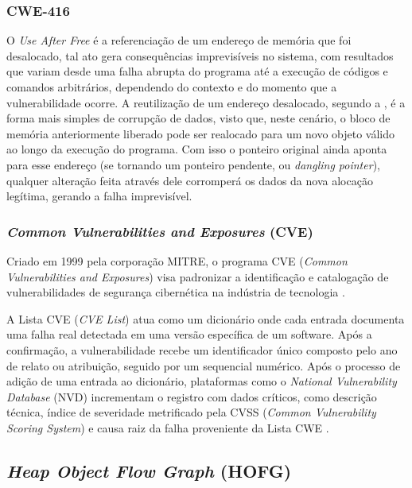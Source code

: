 \documentclass[
    12pt,                %
    openright,           %
    oneside,             %
    a4paper,             %
    english,             %
    brazil               %
]{abntex2}
\begin{document}
\subsubsection{CWE-416}
\label{subsec:cwe416}

O \textit{Use After Free} é a referenciação de um endereço de memória que foi desalocado, tal ato gera consequências imprevisíveis no sistema, com resultados que variam desde uma falha abrupta do programa até a execução de códigos e comandos arbitrários, 
dependendo do contexto e do momento que a vulnerabilidade ocorre. A reutilização de um endereço desalocado, segundo a , é a forma mais simples de corrupção de dados, visto que, neste cenário, 
o bloco de memória anteriormente liberado pode ser realocado para um novo objeto válido ao longo da execução do programa. Com isso o ponteiro original ainda aponta para esse endereço (se tornando um ponteiro pendente, ou \textit{dangling pointer}), 
qualquer alteração feita através dele corromperá os dados da nova alocação legítima, gerando a falha imprevisível.

\subsubsection{\textit{Common Vulnerabilities and Exposures} (CVE)}
\label{subsec:cve}

Criado em 1999 pela corporação MITRE, o programa CVE (\textit{Common Vulnerabilities and Exposures}) visa padronizar a identificação e catalogação de vulnerabilidades de segurança cibernética na indústria de tecnologia \cite{Cve2026}.

\par
A Lista CVE (\textit{CVE List}) atua como um dicionário onde cada entrada documenta uma falha real detectada em uma versão específica de um software. Após a confirmação, a vulnerabilidade recebe um identificador único composto pelo ano de relato ou atribuição, seguido por um sequencial numérico. 
Após o processo de adição de uma entrada ao dicionário, plataformas como o \textit{National Vulnerability Database} (NVD) incrementam o registro com dados críticos, como descrição técnica, índice de severidade metrificado pela CVSS (\textit{Common Vulnerability Scoring System}) e causa raiz da falha proveniente da Lista CWE \cite{Cve2026}.

\subsection{\textit{Heap Object Flow Graph} (HOFG)}
\label{subsec:HOFG}
\end{document}
